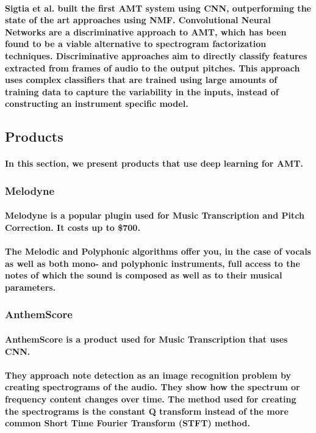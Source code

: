 \paragraph{
Sigtia et al.\cite{REF:10} built the first AMT system using CNN, outperforming the state of the art approaches using NMF. Convolutional
Neural Networks are a discriminative approach to AMT, which has been found to be a
viable alternative to spectrogram factorization techniques. Discriminative approaches
aim to directly classify features extracted from frames of audio to the output pitches.
This approach uses complex classifiers that are trained using large amounts of training
data to capture the variability in the inputs, instead of constructing an instrument
specific model. 
}

\newpage
\subsection{Products}
\paragraph{
In this section, we present products that use deep learning for AMT.
}
\subsubsection{Melodyne}
\paragraph{
Melodyne is a popular plugin used for Music Transcription and Pitch Correction. It costs up to \$700. 	
}
\paragraph{
The Melodic and Polyphonic algorithms offer you, in the case of vocals as well as both mono- and polyphonic instruments, full access to the notes of which the sound is composed as well as to their musical parameters.
}
\subsubsection{AnthemScore}
\paragraph{
AnthemScore is a product used for Music Transcription that uses CNN.
}
\paragraph{
They approach note detection as an image recognition problem by creating spectrograms of the audio. They show how the spectrum or frequency content changes over time. The method used for creating the spectrograms is the constant Q transform instead of the more common Short Time Fourier Transform (STFT) method.
}